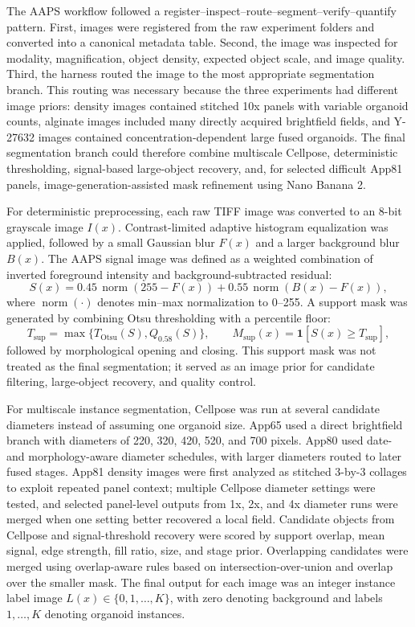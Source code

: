 \documentclass[
]{article}
\begin{document}
The AAPS workflow followed a register--inspect--route--segment--verify--quantify pattern. First, images were registered from the raw experiment folders and converted into a canonical metadata table. Second, the image was inspected for modality, magnification, object density, expected object scale, and image quality. Third, the harness routed the image to the most appropriate segmentation branch. This routing was necessary because the three experiments had different image priors: density images contained stitched 10x panels with variable organoid counts, alginate images included many directly acquired brightfield fields, and Y-27632 images contained concentration-dependent large fused organoids. The final segmentation branch could therefore combine multiscale Cellpose, deterministic thresholding, signal-based large-object recovery, and, for selected difficult App81 panels, image-generation-assisted mask refinement using Nano Banana 2.

For deterministic preprocessing, each raw TIFF image was converted to an 8-bit grayscale image \(I(x)\). Contrast-limited adaptive histogram equalization was applied, followed by a small Gaussian blur \(F(x)\) and a larger background blur \(B(x)\). The AAPS signal image was defined as a weighted combination of inverted foreground intensity and background-subtracted residual:
\[
S(x)=0.45\,\operatorname{norm}(255-F(x))+0.55\,\operatorname{norm}(B(x)-F(x)),
\]
where \(\operatorname{norm}(\cdot)\) denotes min--max normalization to 0--255. A support mask was generated by combining Otsu thresholding with a percentile floor:
\[
T_{\mathrm{sup}}=\max\{T_{\mathrm{Otsu}}(S),Q_{0.58}(S)\}, \qquad M_{\mathrm{sup}}(x)=\mathbf{1}[S(x)\geq T_{\mathrm{sup}}],
\]
followed by morphological opening and closing. This support mask was not treated as the final segmentation; it served as an image prior for candidate filtering, large-object recovery, and quality control.

For multiscale instance segmentation, Cellpose was run at several candidate diameters instead of assuming one organoid size. App65 used a direct brightfield branch with diameters of 220, 320, 420, 520, and 700 pixels. App80 used date- and morphology-aware diameter schedules, with larger diameters routed to later fused stages. App81 density images were first analyzed as stitched 3-by-3 collages to exploit repeated panel context; multiple Cellpose diameter settings were tested, and selected panel-level outputs from 1x, 2x, and 4x diameter runs were merged when one setting better recovered a local field. Candidate objects from Cellpose and signal-threshold recovery were scored by support overlap, mean signal, edge strength, fill ratio, size, and stage prior. Overlapping candidates were merged using overlap-aware rules based on intersection-over-union and overlap over the smaller mask. The final output for each image was an integer instance label image \(L(x)\in\{0,1,\ldots,K\}\), with zero denoting background and labels \(1,\ldots,K\) denoting organoid instances.
\end{document}
